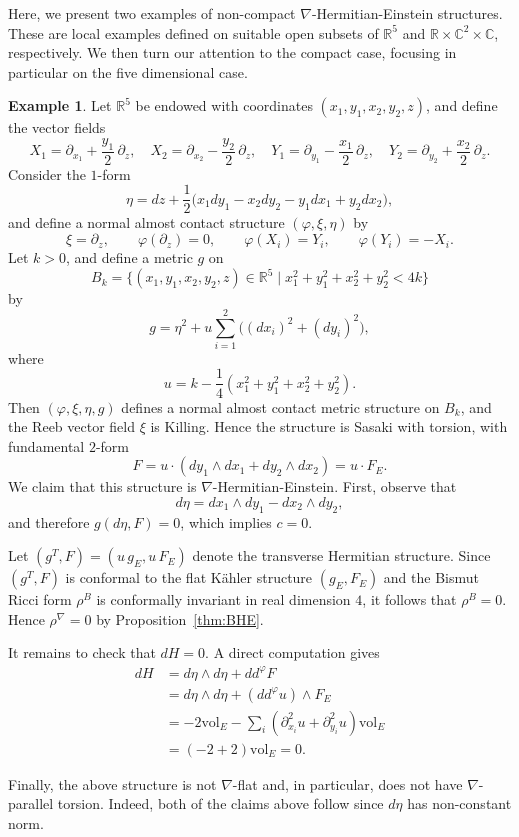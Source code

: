 \documentclass{article}
\theoremstyle{definition}
\newtheorem{ex}[thm]{Example}
\newcommand{\vol}{{\mathrm{vol}}}
\renewcommand{\phi}{\varphi}
\numberwithin{equation}{section}
\begin{document}
Here, we present two examples of non-compact $\nabla$-Hermitian-Einstein structures. These are local examples defined on suitable open subsets of $\mathbb{R}^5$ and $\mathbb{R} \times \mathbb{C}^2  \times \mathbb{C}$, respectively. We then turn our attention to the compact case, focusing in particular on the five dimensional case.

\begin{ex} \label{ex:noncompactBHE}
Let $\mathbb{R}^5$ be endowed with coordinates $(x_1,y_1,x_2,y_2,z)$, and define the vector fields
\[
X_1 = \partial_{x_1} + \frac{y_1}{2}\,\partial_z, \quad 
X_2 = \partial_{x_2} - \frac{y_2}{2}\,\partial_z, \quad 
Y_1 = \partial_{y_1} - \frac{x_1}{2}\,\partial_z, \quad 
Y_2 = \partial_{y_2} + \frac{x_2}{2}\,\partial_z.
\]
Consider the $1$-form
\[
\eta = dz + \frac{1}{2}\bigl(x_1 dy_1 - x_2 dy_2 - y_1 dx_1 + y_2 dx_2\bigr),
\]
and define a normal almost contact structure $(\phi,\xi,\eta)$ by
\[
\xi = \partial_z, \qquad \phi(\partial_z) = 0, \qquad 
\phi(X_i) = Y_i, \qquad \phi(Y_i) = -X_i.
\]
Let $k>0$, and define a metric $g$ on
\[
B_k=\{(x_1,y_1,x_2,y_2,z)\in \mathbb{R}^5 \mid x_1^2+y_1^2+x_2^2+y_2^2<4k\}
\]
by
\[
g = \eta^2 + u \sum_{i=1}^2 \bigl((dx_i)^2 + (dy_i)^2\bigr),
\]
where
\[
u = k - \frac{1}{4}(x_1^2 + y_1^2 + x_2^2 + y_2^2).
\]
Then $(\phi,\xi,\eta,g)$ defines a normal almost contact metric structure on $B_k$, and the Reeb vector field $\xi$ is Killing. Hence the structure is Sasaki with torsion, with fundamental $2$-form
\[
F = u \cdot(dy_1 \wedge dx_1 + dy_2 \wedge dx_2) = u\cdot F_E.
\]
We claim that this structure is $\nabla$-Hermitian-Einstein. First, observe that
\[
d\eta = dx_1 \wedge dy_1 - dx_2 \wedge dy_2,
\]
and therefore $g(d\eta,F)=0$, which implies $c=0$.

Let $(g^T,F) = (u\,g_E, u\,F_E)$ denote the transverse Hermitian structure. Since $(g^T,F)$ is conformal to the flat K\"ahler structure $(g_E,F_E)$ and the Bismut Ricci form $\rho^B$ is conformally invariant in real dimension $4$, it follows that $\rho^B = 0$. Hence $\rho^\nabla = 0$ by Proposition~\ref{thm:BHE}.

It remains to check that $dH = 0$. A direct computation gives
\begin{align*}
dH &= d\eta \wedge d\eta + dd^\phi F \\
&= d\eta \wedge d\eta + (dd^\phi u)\wedge F_E \\
&= -2\vol_E - \sum_{i} (\partial_{x_i}^2u+\partial_{y_i}^2u )\vol_E  \\     &=(-2+2)\vol_E=0.
\end{align*}


Finally, the above structure is not $\nabla$-flat and, in particular, does not have $\nabla$-parallel torsion. Indeed, both of the claims above follow since $d\eta$ has non-constant norm.  \par

\end{ex}
\end{document}

